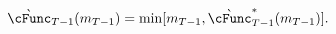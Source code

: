   \begin{equation}\begin{gathered}\begin{aligned}
        \grave{\cFunc}_{T-1}(m_{T-1})  & = \min[{m}_{T-1},\grave{\cFunc}^{\ast}_{T-1}(m_{T-1})] \label{eq:LiqCons}.
      \end{aligned}\end{gathered}\end{equation}
